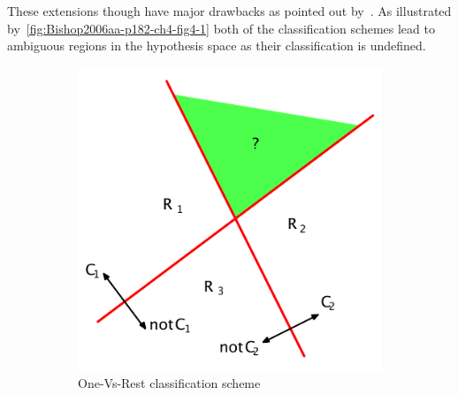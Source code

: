 These extensions though have major drawbacks as pointed out by~\cite[Chapter 5.2.2]{Duda:1973aa}. As illustrated by~\ref{fig:Bishop2006aa-p182-ch4-fig4-1} both of the classification schemes lead to ambiguous regions in the hypothesis space as their classification is undefined.

\begin{figure}[h]
    \centering
    \begin{subfigure}[b]{0.4\textwidth}
        \includegraphics[width=\textwidth]{img/Bishop2006aa-p182-ch4-fig4-1-a.pdf}
        \caption{One-Vs-Rest classification scheme}
        \label{fig:Bishop2006aa-p182-ch4-fig4-1-a}
    \end{subfigure}
    ~ %
    \begin{subfigure}[b]{0.4\textwidth}

\end{subfigure}
\end{figure}

